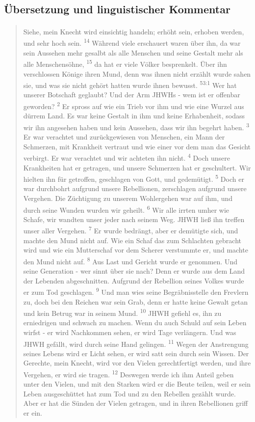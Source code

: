 \subsection{Übersetzung und linguistischer Kommentar}
\begin{quote}
	\textsuperscript{}
		Siehe, mein Knecht wird einsichtig handeln; erhöht sein, erhoben werden, und sehr hoch sein.
	\textsuperscript{14}
		Während viele erschauert waren über ihn,
		da war sein Aussehen mehr gesalbt als alle Menschen
		und seine Gestalt mehr als alle Menschensöhne,
	\textsuperscript{15}
		da hat er viele Völker besprenkelt.
		Über ihn verschlossen Könige ihren Mund, denn was ihnen nicht erzählt wurde sahen sie, und was sie nicht gehört hatten wurde ihnen bewusst.
	\textsuperscript{53:1}
		Wer hat unserer Botschaft geglaubt?
		Und der Arm JHWHs - wem ist er offenbar geworden?
	\textsuperscript{2}
		Er spross auf wie ein Trieb vor ihm und wie eine Wurzel aus dürrem Land.
		Es war keine Gestalt in ihm und keine Erhabenheit, sodass wir ihn angesehen haben und kein Aussehen, dass wir ihn begehrt haben.
	\textsuperscript{3}
		Er war verachtet und zurückgewiesen von Menschen, ein Mann der Schmerzen, mit Krankheit vertraut und wie einer vor dem man das Gesicht verbirgt.
		Er war verachtet und wir achteten ihn nicht.
	\textsuperscript{4}
		Doch unsere Krankheiten hat er getragen, und unsere Schmerzen hat er geschultert.
		Wir hielten ihn für getroffen, geschlagen von Gott, und gedemütigt.
	\textsuperscript{5}
		Doch er war durchbohrt aufgrund unsere Rebellionen, zerschlagen aufgrund unsere Vergehen.
		Die Züchtigung zu unserem Wohlergehen war auf ihm, und durch seine Wunden wurden wir geheilt.
	\textsuperscript{6}
		Wir alle irrten umher wie Schafe, wir wandten unser jeder nach seinem Weg.
		JHWH ließ ihn treffen unser aller Vergehen.
	\textsuperscript{7}
		Er wurde bedrängt, aber er demütigte sich, und machte den Mund nicht auf.
		Wie ein Schaf das zum Schlachten gebracht wird und wie ein Mutterschaf vor dem Scherer verstummte er, und machte den Mund nicht auf.
	\textsuperscript{8}
		Aus Last und Gericht wurde er genommen.
		Und seine Generation - wer sinnt über sie nach?
		Denn er wurde aus dem Land der Lebenden abgeschnitten.
		Aufgrund der Rebellion seines Volkes wurde er zum Tod geschlagen.
	\textsuperscript{9}
		Und man wies seine Begräbnisstelle den Frevlern zu, doch bei den Reichen war sein Grab, denn er hatte keine Gewalt getan und kein Betrug war in seinem Mund.
	\textsuperscript{10}
		JHWH gefiehl es, ihn zu erniedrigen und schwach zu machen.
		Wenn du auch Schuld auf sein Leben wirfst - er wird Nachkommen sehen, er wird Tage verlängern.
		Und was JHWH gefällt, wird durch seine Hand gelingen.
	\textsuperscript{11}
		Wegen der Anstrengung seines Lebens wird er Licht sehen, er wird satt sein durch sein Wissen.
		Der Gerechte, mein Knecht, wird vor den Vielen gerechtfertigt werden,
		und ihre Vergehen, er wird sie tragen.
	\textsuperscript{12}
		Deswegen werde ich ihm Anteil geben unter den Vielen, und mit den Starken wird er die Beute teilen,
		weil er sein Leben ausgeschüttet hat zum Tod und zu den Rebellen gezählt wurde.
		Aber er hat die Sünden der Vielen getragen, und in ihren Rebellionen griff er ein.
\end{quote}

